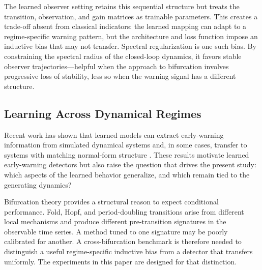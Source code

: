 The learned observer setting retains this sequential structure but treats the
transition, observation, and gain matrices as trainable parameters. This
creates a trade-off absent from classical indicators: the learned mapping can
adapt to a regime-specific warning pattern, but the architecture and loss
function impose an inductive bias that may not transfer. Spectral
regularization is one such bias. By constraining the spectral radius of the
closed-loop dynamics, it favors stable observer trajectories---helpful when
the approach to bifurcation involves progressive loss of stability, less so
when the warning signal has a different structure.

\subsection{Learning Across Dynamical Regimes}
\label{sec:related:regimes}

Recent work has shown that learned models can extract early-warning
information from simulated dynamical systems and, in some cases, transfer to
systems with matching normal-form structure
\citep{bury2021deep,deb2022machine}. These results motivate learned
early-warning detectors but also raise the question that drives the present
study: which aspects of the learned behavior generalize, and which remain
tied to the generating dynamics?

Bifurcation theory provides a structural reason to expect conditional
performance. Fold, Hopf, and period-doubling transitions arise from different
local mechanisms \citep{kuznetsov2004elements,strogatz2015nonlinear} and
produce different pre-transition signatures in the observable time series. A
method tuned to one signature may be poorly calibrated for another. A
cross-bifurcation benchmark is therefore needed to distinguish a useful
regime-specific inductive bias from a detector that transfers uniformly. The
experiments in this paper are designed for that distinction.
